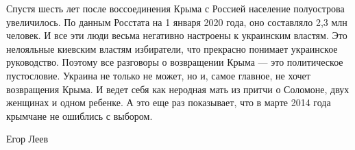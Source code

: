 Спустя шесть лет после воссоединения Крыма с Россией население полуострова увеличилось. По данным Росстата на 1 января 2020 года, оно составляло 2,3 млн человек. И все эти люди весьма негативно настроены к украинским властям. Это нелояльные киевским властям избиратели, что прекрасно понимает украинское руководство. Поэтому все разговоры о возвращении Крыма --- это политическое пустословие. Украина не только не может, но и, самое главное, не хочет возвращения Крыма. И ведет себя как неродная мать из притчи о Соломоне, двух женщинах и одном ребенке. А это еще раз показывает, что в марте 2014 года крымчане не ошиблись с выбором.

Егор Леев
  
